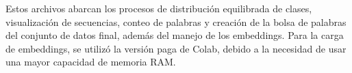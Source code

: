 Estos archivos abarcan los procesos de distribución equilibrada de clases, visualización de secuencias, conteo de palabras y creación de la bolsa de palabras del conjunto de datos final, además del manejo de los embeddings. Para la carga de embeddings, se utilizó la versión paga de Colab, debido a la necesidad de usar una mayor capacidad de memoria RAM.
